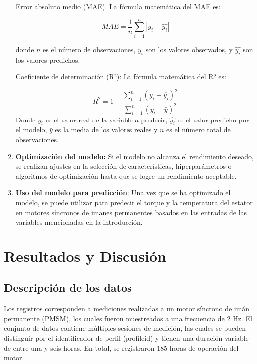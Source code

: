 \documentclass{article}
\begin{document}
\begin{enumerate}
Error absoluto medio (MAE). La fórmula matemática del MAE es: 

$$MAE = \frac{1}{n}\sum_{i=1}^n |y_i - \hat{y_i}|$$

donde $n$ es el número de observaciones, $y_i$ son los valores observados, y $\hat{y_i}$ son los valores predichos.





Coeficiente de determinación (R²):
La fórmula matemática del R² es:

$$R^2 = 1 - \frac{\sum_{i=1}^{n}(y_i - \hat{y_i})^2}{\sum_{i=1}^{n}(y_i - \bar{y})^2}$$
Donde $y_i$ es el valor real de la variable a predecir, $\hat{y_i}$ es el valor predicho por el modelo, $\bar{y}$ es la media de los valores reales y $n$ es el número total de observaciones.




\item \textbf{Optimización del modelo:} Si el modelo no alcanza el rendimiento deseado, se realizan ajustes en la selección de características, hiperparámetros o algoritmos de optimización hasta que se logre un rendimiento aceptable.
\item \textbf{Uso del modelo para predicción:} Una vez que se ha optimizado el modelo, se puede utilizar para predecir el torque y la temperatura del estator en motores síncronos de imanes permanentes basados en las entradas de las variables mencionadas en la introducción.
\end{enumerate}

\section{Resultados y Discusión}

\subsection{Descripción de los datos}

Los registros corresponden a mediciones realizadas a un motor síncrono de imán permanente (PMSM), los cuales fueron muestreados a una frecuencia de 2 Hz. El conjunto de datos contiene múltiples sesiones de medición, las cuales se pueden distinguir por el identificador de perfil (profile\textunderscore id) y tienen una duración variable de entre una y seis horas. En total, se registraron 185 horas de operación del motor.
\end{document}
